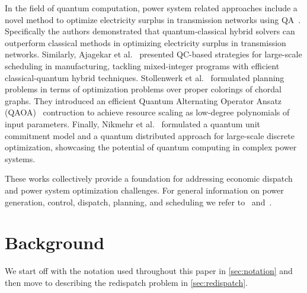\documentclass[conference]{IEEEtran}
\begin{document}
In the field of quantum computation, power system related approaches
include a novel method to optimize electricity surplus in transmission
networks using QA~\cite{colucci2023power}. Specifically the authors
demonstrated that quantum-classical hybrid solvers can outperform
classical methods in optimizing electricity surplus in transmission
networks. Similarly, Ajagekar et al.~\cite{ajagekar2022hybrid} presented
QC-based strategies for large-scale scheduling in manufacturing,
tackling mixed-integer programs with efficient classical-quantum hybrid
techniques. Stollenwerk et al.~\cite{stollenwerk2020toward} formulated
planning problems in terms of optimization problems over proper
colorings of chordal graphs. They introduced an efficient Quantum
Alternating Operator Ansatz (QAOA)~\cite{farhi2014} contruction to
achieve resource scaling as low-degree polynomials of input
parameters. Finally, Nikmehr et al.~\cite{nikmehr2022quantum} formulated
a quantum unit commitment model and a quantum distributed approach for
large-scale discrete optimization, showcasing the potential of quantum
computing in complex power systems.




These works collectively provide a foundation for addressing economic
dispatch and power system optimization challenges. For general
information on power generation, control, dispatch, planning, and
scheduling we refer to~\cite{wood1996power}
and~\cite{pinedo2005planning}.


\section{Background} \label{sec:background}

We start off with the notation used throughout this paper in
\cref{sec:notation} and then move to describing the redispatch problem
in \cref{sec:redispatch}.
\end{document}
